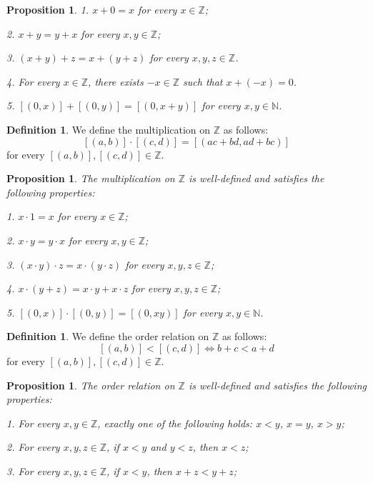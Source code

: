 \documentclass[12pt, reqno]{amsart}
\newtheorem{proposition}[theorem]{Proposition}
\theoremstyle{definition}
\newtheorem{definition}[theorem]{Definition}
\theoremstyle{remark}
\numberwithin{equation}{section}
\begin{document}
{\begin{proposition}
    1. $x + 0 = x$ for every $x\in \mathbb{Z}$;

    2. $x + y = y + x$ for every $x, y \in \mathbb{Z}$;

    3. $(x + y) + z = x + (y + z)$ for every $x, y, z \in \mathbb{Z}$.

    4. For every $x\in \mathbb{Z}$, there exists $-x \in \mathbb{Z}$ such that $x + (-x) = 0$.
    
    5. $[(0, x)] + [(0,y)] = [(0, x + y)]$ for every $x, y \in \mathbb{N}$.
\end{proposition}

\begin{definition}
    We define the multiplication on $\mathbb{Z}$ as follows:
    \[
        [(a, b)] \cdot [(c, d)] = [(ac + bd, ad + bc)]
    \]
    for every $[(a, b)], [(c, d)] \in \mathbb{Z}$.
\end{definition}

\begin{proposition}
    The multiplication on $\mathbb{Z}$ is well-defined and satisfies the following properties:

    1. $x \cdot 1 = x$ for every $x\in \mathbb{Z}$;

    2. $x \cdot y = y \cdot x$ for every $x, y \in \mathbb{Z}$;

    3. $(x \cdot y) \cdot z = x \cdot (y \cdot z)$ for every $x, y, z \in \mathbb{Z}$;

    4. $x \cdot (y + z) = x \cdot y + x \cdot z$ for every $x, y, z \in \mathbb{Z}$;

    5. $[(0, x)] \cdot [(0,y)] = [(0, xy)]$ for every $x, y \in \mathbb{N}$.
\end{proposition}

\begin{definition}
    We define the order relation on $\mathbb{Z}$ as follows:
    \[
        [(a, b)] < [(c, d)] \iff b + c < a + d
    \]
    for every $[(a, b)], [(c, d)] \in \mathbb{Z}$.
\end{definition}

\begin{proposition}
    The order relation on $\mathbb{Z}$ is well-defined and satisfies the following properties:

    1. For every $x, y \in \mathbb{Z}$, exactly one of the following holds: $x < y$, $x = y$, $x > y$;

    2. For every $x, y, z \in \mathbb{Z}$, if $x < y$ and $y < z$, then $x < z$;

    3. For every $x, y, z \in \mathbb{Z}$, if $x < y$, then $x + z < y + z$;


\end{proposition}}
\end{document}

